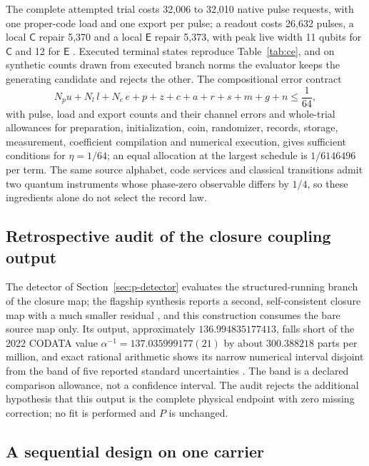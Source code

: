 \documentclass[11pt]{article}
\theoremstyle{definition}
\theoremstyle{remark}
\theoremstyle{plain}
\newcommand{\Cn}{\mathsf{C}}
\newcommand{\En}{\mathsf{E}}
\begin{document}
The complete attempted trial costs 32,006 to 32,010 native pulse requests,
with one proper-code load and one export per pulse; a readout costs 26,632
pulses, a local $\Cn$ repair 5,370 and a local $\En$ repair 5,373, with peak
live width 11 qubits for $\Cn$ and 12 for $\En$ \cite{sdREADME}. Executed
terminal states reproduce Table~\ref{tab:ce}, and on synthetic counts drawn
from executed branch norms the evaluator keeps the generating candidate and
rejects the other. The compositional error contract
\[
N_pu+N_l\,l+N_e\,e+p+z+c+a+r+s+m+g+n\le\frac1{64},
\]
with pulse, load and export counts and their channel errors and whole-trial
allowances for preparation, initialization, coin, randomizer, records,
storage, measurement, coefficient compilation and numerical execution, gives
sufficient conditions for $\eta=1/64$; an equal allocation at the largest
schedule is $1/6146496$ per term. The same source alphabet, code services and
classical transitions admit two quantum instruments whose phase-zero
observable differs by $1/4$, so these ingredients alone do not select the
record law.

\subsection{Retrospective audit of the closure coupling output}
\label{sec:endpoint}

The detector of Section~\ref{sec:p-detector} evaluates the structured-running
branch of the closure map; the flagship synthesis reports a second,
self-consistent closure map with a much smaller residual \cite{flagship}, and
this construction consumes the bare source map only. Its output,
approximately $136.994835177413$, falls short of the 2022 CODATA value
$\alpha^{-1}=137.035999177(21)$ \cite{codata2022} by about $300.388218$ parts
per million, and exact rational arithmetic shows its narrow numerical
interval disjoint from the band of five reported standard uncertainties
\cite{prREADME,prDERIV}. The band is a declared comparison allowance, not a
confidence interval. The audit rejects the additional hypothesis that this
output is the complete physical endpoint with zero missing correction; no fit
is performed and $P$ is unchanged.

\subsection{A sequential design on one carrier}
\label{sec:sequential}
\end{document}

